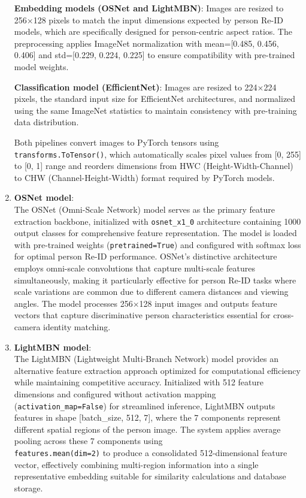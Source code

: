 \begin{enumerate}
    \textbf{Embedding models (OSNet and LightMBN)}: Images are resized to 256×128 pixels to match the input dimensions expected by person Re-ID models, which are specifically designed for person-centric aspect ratios. The preprocessing applies ImageNet normalization with mean=[0.485, 0.456, 0.406] and std=[0.229, 0.224, 0.225] to ensure compatibility with pre-trained model weights.
    
    \textbf{Classification model (EfficientNet)}: Images are resized to 224×224 pixels, the standard input size for EfficientNet architectures, and normalized using the same ImageNet statistics to maintain consistency with pre-training data distribution.
    
    Both pipelines convert images to PyTorch tensors using \\
    \texttt{transforms.ToTensor()}, which automatically scales pixel values from [0, 255] to [0, 1] range and reorders dimensions from HWC (Height-Width-Channel) to CHW (Channel-Height-Width) format required by PyTorch models.
    
    \item \textbf{OSNet model}:\\
    The OSNet (Omni-Scale Network) model serves as the primary feature extraction backbone, initialized with \texttt{osnet\_x1\_0} architecture containing 1000 output classes for comprehensive feature representation. The model is loaded with pre-trained weights (\texttt{pretrained=True}) and configured with softmax loss for optimal person Re-ID performance. OSNet's distinctive architecture employs omni-scale convolutions that capture multi-scale features simultaneously, making it particularly effective for person Re-ID tasks where scale variations are common due to different camera distances and viewing angles. The model processes 256×128 input images and outputs feature vectors that capture discriminative person characteristics essential for cross-camera identity matching.
    
    \item \textbf{LightMBN model}:\\
    The LightMBN (Lightweight Multi-Branch Network) model provides an alternative feature extraction approach optimized for computational efficiency while maintaining competitive accuracy. Initialized with 512 feature dimensions and configured without activation mapping (\texttt{activation\_map=False}) for streamlined inference, LightMBN outputs features in shape [batch\_size, 512, 7], where the 7 components represent different spatial regions of the person image. The system applies average pooling across these 7 components using \\ \texttt{features.mean(dim=2)} to produce a consolidated 512-dimensional feature vector, effectively combining multi-region information into a single representative embedding suitable for similarity calculations and database storage.
    

\end{enumerate}
